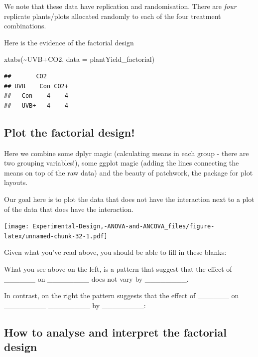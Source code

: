 \documentclass[
]{book}
\newenvironment{Shaded}{\begin{snugshade}}{\end{snugshade}}
\newcommand{\AttributeTok}[1]{\textcolor[rgb]{0.77,0.63,0.00}{#1}}
\newcommand{\FunctionTok}[1]{\textcolor[rgb]{0.00,0.00,0.00}{#1}}
\newcommand{\NormalTok}[1]{#1}
\newcommand{\SpecialCharTok}[1]{\textcolor[rgb]{0.00,0.00,0.00}{#1}}
\begin{document}
We note that these data have replication and randomisation. There are \emph{four} replicate plants/plots allocated randomly to each of the four treatment combinations.

Here is the evidence of the factorial design

\begin{Shaded}
\begin{Highlighting}[]
\FunctionTok{xtabs}\NormalTok{(}\SpecialCharTok{\textasciitilde{}}\NormalTok{UVB}\SpecialCharTok{+}\NormalTok{CO2, }\AttributeTok{data =}\NormalTok{ plantYield\_factorial)}
\end{Highlighting}
\end{Shaded}

\begin{verbatim}
##       CO2
## UVB    Con CO2+
##   Con    4    4
##   UVB+   4    4
\end{verbatim}

\hypertarget{plot-the-factorial-design}{%
\subsection{Plot the factorial design!}\label{plot-the-factorial-design}}

Here we combine some dplyr magic (calculating means in each group - there are two grouping variables!), some ggplot magic (adding the lines connecting the means on top of the raw data) and the beauty of patchwork, the package for plot layouts.

Our goal here is to plot the data that does not have the interaction next to a plot of the data that does have the interaction.

\texttt{[image: Experimental-Design,-ANOVA-and-ANCOVA\_files/figure-latex/unnamed-chunk-32-1.pdf]}

Given what you've read above, you should be able to fill in these blanks:

What you see above on the left, is a pattern that suggest that the effect of \_\_\_\_\_\_ on \_\_\_\_\_\_\_\_ does not vary by \_\_\_\_\_\_\_\_.

In contrast, on the right the pattern suggests that the effect of \_\_\_\_\_\_ on \_\_\_\_\_\_\_\_ \_\_\_\_\_\_\_\_ by \_\_\_\_\_\_\_\_:

\hypertarget{how-to-analyse-and-interpret-the-factorial-design}{%
\subsection{How to analyse and interpret the factorial design}\label{how-to-analyse-and-interpret-the-factorial-design}}
\end{document}
